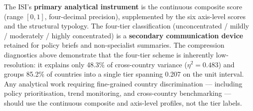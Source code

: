 \begin{tcolorbox}[
  colback=blue!3, colframe=blue!60!black,
  title={\small\bfseries Methodological clarification: primary vs.\
    secondary instruments},
  fonttitle=\small, boxrule=0.5pt, arc=2pt,
  left=4pt, right=4pt, top=3pt, bottom=3pt
]
\small
The ISI's \textbf{primary analytical instrument} is the continuous
composite score (range $[0,1]$, four-decimal precision), supplemented
by the six axis-level scores and the structural typology.  The
four-tier classification (unconcentrated / mildly / moderately /
highly concentrated) is a \textbf{secondary communication device}
retained for policy briefs and non-specialist summaries.  The
compression diagnostics above demonstrate that the four-tier scheme
is inherently low-resolution: it explains only 48.3\% of
cross-country variance ($\eta^2 = 0.483$) and groups 85.2\% of
countries into a single tier spanning 0.207 on the unit interval.
Any analytical work requiring fine-grained country discrimination
--- including policy prioritisation, trend monitoring, and
cross-country benchmarking --- should use the continuous composite
and axis-level profiles, not the tier labels.
\end{tcolorbox}
